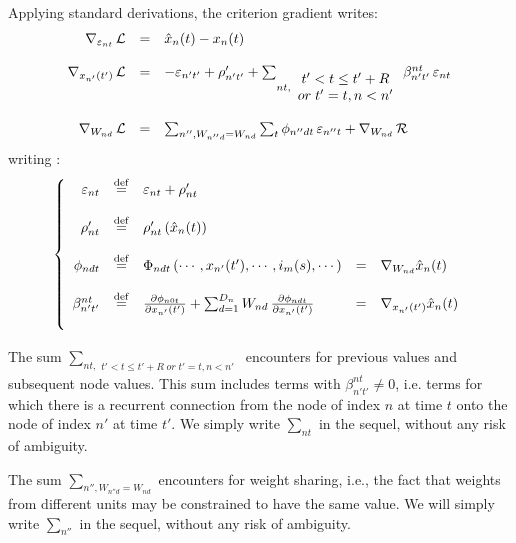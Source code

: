 Applying standard derivations, the criterion gradient writes:
\[ \begin{array}{rcll}
\nabla_{\varepsilon_{nt}} \, {\cal L} &=& \hat{x}_n(t) - x_n(t) \\
&&\\
\nabla_{x_{n'}(t')} \, {\cal L} &=&  
-\varepsilon_{n't'} + \rho'_{n't'} + \sum_{nt, \begin{array}{c} t' < t \leq t' + R \\ or\; t' = t, n < n'\end{array}} \beta_{n't'}^{nt} \, \varepsilon_{nt} \\
&&\\
\nabla_{W_{nd}} \, {\cal L}  &=& \sum_{n'', W_{n''d} = W_{nd}} \sum_t \phi_{n''dt} \, \varepsilon_{n''t} + \nabla_{W_{nd}} \, {\cal R} \\
\end{array} \]
writing : {\small \[ \left\{ \begin{array}{rclcl}
\varepsilon_{nt} &\stackrel {\rm def}{=}&  \varepsilon_{nt} + \rho'_{nt}\\
&\\
\rho'_{nt} &\stackrel {\rm def}{=}&\rho'_{nt} \, (\hat{x}_n(t)) \\
&\\
\phi_{ndt} &\stackrel {\rm def}{=}& \Phi_{ndt}\left(\cdots, x_{n'}(t'), \cdots, i_{m}(s), \cdots\right) &=& \nabla_{W_{nd}} \hat{x}_n(t)\\
&\\
\beta_{n't'}^{nt} &\stackrel {\rm def}{=}& \frac{\partial \phi_{n0t}}{\partial x_{n'}(t')} + \sum_{d = 1}^{D_{n}} W_{nd} \, \frac{\partial \phi_{ndt}}{\partial x_{n'}(t')} &=& \nabla_{x_{n'}(t')} \hat{x}_n(t) \\
&\\
\end{array} \right. \]}

The sum $\sum_{nt, \begin{array}{c} t' < t \leq t' + R \;or\; t' = t, n < n'\end{array}}$ encounters for previous values and subsequent node values. This sum includes terms with $\beta_{n't'}^{nt} \neq 0$, i.e. terms for which there is a recurrent connection from the node of index $n$ at time $t$ onto the node of index $n'$ at time $t'$. We simply write $\sum_{nt}$ in the sequel, without any risk of ambiguity.

The sum $\sum_{n'', W_{n''d} = W_{nd}}$ encounters for weight sharing, i.e., the fact that weights from different units may be constrained to have the same value. We will simply write $\sum_{n''}$ in the sequel, without any risk of ambiguity.

